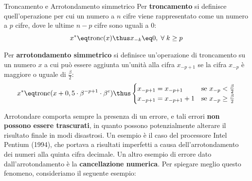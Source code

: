 \begin{definition}{Troncamento e Arrotondamento simmetrico}
    Per \textbf{troncamento} si definisce quell'operazione per cui un numero a $n$ cifre viene rappresentato come un numero a $p$ cifre, dove le ultime $n - p$ cifre sono uguali a 0:
    \[ x^* \eq \text{tronc}(x) \thus x_{-k} \eq 0, \; \forall \; k \geq p \]

    Per \textbf{arrotondamento simmetrico} si definisce un'operazione di troncamento su un numero $x$ a cui può essere aggiunta un'unità alla cifra $x_{-p + 1}$ se la cifra $x_{-p}$ è maggiore o uguale di $\frac{\beta}{2}$:
    \[ x^* \eq \text{tronc}(x + 0,5 \cdot \beta^{-p+1} \cdot \beta^e) \thus \begin{cases}
        x_{-p + 1} = x_{-p + 1} & \text{se } x_{-p} < \frac{\beta}{2} \\
        x_{-p + 1} = x_{-p + 1} + 1 & \text{se } x_{-p} \geq \frac{\beta}{2}
    \end{cases}\]
\end{definition}

Arrotondare comporta sempre la presenza di un errore, e tali errori \textbf{non possono essere trascurati}, in quanto possono potenzialmente alterare il risultato finale in modi disastrosi. Un esempio è il caso del processore Intel Pentium (1994), che portava a risultati imperfetti a causa dell'arrotondamento dei numeri alla quinta cifra decimale.
\nl
Un altro esempio di errore dato dall'arrotondamento è la \textbf{cancellazione numerica}. Per spiegare meglio questo fenomeno, consideriamo il seguente esempio:

